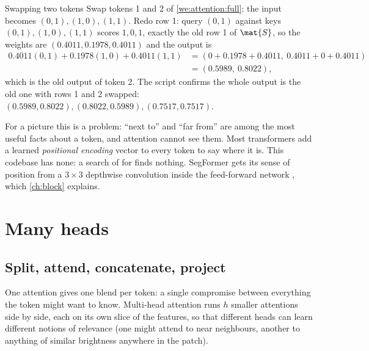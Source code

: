 \begin{worked}[label={we:attention:perm}]{Swapping two tokens}
Swap tokens 1 and 2 of \cref{we:attention:full}: the input becomes $(0,1), (1,0), (1,1)$. Redo
row 1: query $(0,1)$ against keys $(0,1), (1,0), (1,1)$ scores $1, 0, 1$, exactly the old row 1
of $\mat{S}$, so the weights are $(0.4011, 0.1978, 0.4011)$ and the output is
\begin{align*}
  0.4011(0,1) + 0.1978(1,0) + 0.4011(1,1) &= (0 + 0.1978 + 0.4011,\ 0.4011 + 0 + 0.4011)\\
  &= (0.5989,\ 0.8022),
\end{align*}
which is the old output of token 2. The script confirms the whole output is the old one with rows
1 and 2 swapped: $(0.5989, 0.8022), (0.8022, 0.5989), (0.7517, 0.7517)$\tagC.
\end{worked}

For a picture this is a problem: ``next to'' and ``far from'' are among the most useful facts
about a token, and attention cannot see them. Most transformers add a learned \emph{positional
encoding} vector to every token to say where it is. This codebase has
none: a search of  for  finds nothing. SegFormer gets its sense of
position from a $3\times3$ depthwise convolution inside the feed-forward network
\citep{xie2021segformer}, which \cref{ch:block} explains.

\section{Many heads}\label{sec:attention:heads}

\subsection{Split, attend, concatenate, project}

One attention gives one blend per token: a single compromise between everything the token might
want to know. Multi-head attention runs $h$ smaller attentions side by side, each on its own slice
of the features, so that different heads can learn different notions of relevance (one might
attend to near neighbours, another to anything of similar brightness anywhere in the patch).

